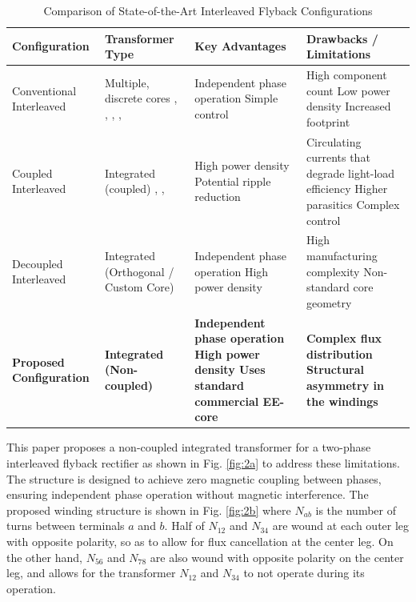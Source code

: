 \documentclass[lettersize,journal]{IEEEtran}
\begin{document}
\begin{table}[b!]
    {\color{red}
    \caption{Comparison of State-of-the-Art Interleaved Flyback Configurations}
    \renewcommand{\arraystretch}{1.5}
    \centering
    \footnotesize
    \begin{tabular}{l m{4cm} m{4.5cm} m{4.5cm}}
        \hline
        \textbf{Configuration} & \textbf{Transformer Type} & \textbf{Key Advantages} & \textbf{Drawbacks / Limitations} \\
        \hline \hline
        Conventional Interleaved & Multiple, discrete cores \cite{shi2024}, \cite{cheng2018}, \cite{wu2015}, \cite{cheng2023}, \cite{mayer2025} & Independent phase operation \newline Simple control & High component count \newline Low power density \newline Increased footprint \\
        Coupled Interleaved & Integrated (coupled) \cite{ishihara2015}, \cite{tonolo2025}, \cite{qian2008} & High power density \newline Potential ripple reduction & Circulating currents that degrade light-load efficiency \cite{Yang_2020, Z_Li_2025} \newline Higher parasitics \cite{meng2021, kwon2024} \newline Complex control \cite{Mao_2011} \\
        Decoupled Interleaved & Integrated (Orthogonal / Custom Core) \cite{Z_Li_2025, Ouyang, fayyaz2025} & Independent phase operation \newline High power density & High manufacturing complexity \newline Non-standard core geometry \\
        \textbf{Proposed Configuration} & \textbf{Integrated (Non-coupled)} & \textbf{Independent phase operation \newline High power density \newline Uses standard commercial EE-core} & \textbf{Complex flux distribution \newline Structural asymmetry in the windings} \\
        \hline
    \end{tabular}
    \label{tab:literature_comparison}
    }
\end{table}

This paper proposes a non-coupled integrated transformer for a two-phase interleaved flyback rectifier as shown in Fig. \ref{fig:2a} to address these limitations. The structure is designed to achieve zero magnetic coupling between phases, ensuring independent phase operation without magnetic interference. The proposed winding structure is shown in Fig. \ref{fig:2b} where $N_{ab}$ is the number of turns between terminals $a$ and $b$. Half of $N_{12}$ and $N_{34}$ are wound at each outer leg with opposite polarity, so as to allow for flux cancellation at the center leg. On the other hand, $N_{56}$ and $N_{78}$ are also wound with opposite polarity on the center leg, and allows for the transformer $N_{12}$ and $N_{34}$ to not operate during its operation. 
\end{document}
